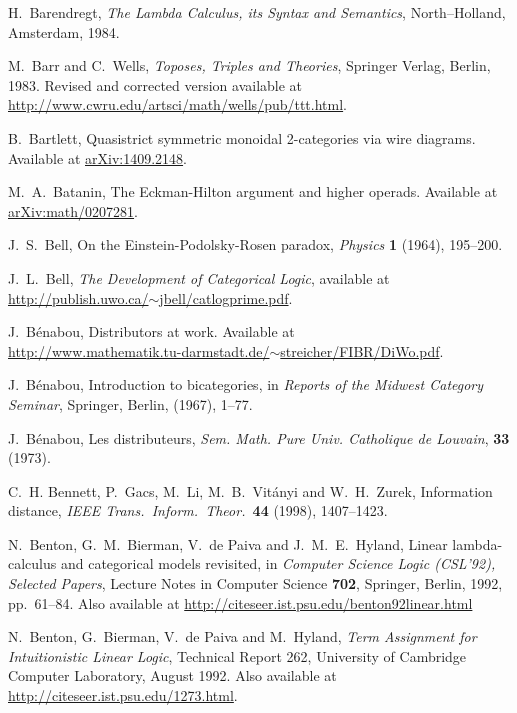\documentclass[12pt,twoside,openright]{report}
\begin{document}
\begin{thebibliography}{99}
 H.\ Barendregt, {\sl The Lambda Calculus, its Syntax and Semantics}, North--Holland, Amsterdam, 1984.

 M.\ Barr and C.\ Wells, {\sl Toposes, Triples and Theories}, Springer Verlag, Berlin, 1983.  Revised and corrected version available at \href{http://www.cwru.edu/artsci/math/wells/pub/ttt.html}{
http://www.cwru.edu/artsci/math/wells/pub/ttt.html}.

 B.\ Bartlett, Quasistrict symmetric monoidal 2-categories via wire diagrams.  Available at \href{http://arxiv.org/abs/1409.2148}{arXiv:1409.2148}.

M.\ A.\ Batanin, The Eckman-Hilton argument and higher operads.  Available at
\href{http://arxiv.org/abs/math/0207281}{arXiv:math/0207281}.

 J.\ S.\ Bell, On the Einstein-Podolsky-Rosen paradox, {\sl Physics} {\bf 1} (1964), 195--200.

 J.\ L.\ Bell, {\sl The Development of Categorical Logic}, available at \hfill \break
\href{http://publish.uwo.ca/~jbell/catlogprime.pdf}{http://publish.uwo.ca/$\sim$jbell/catlogprime.pdf}.

 J.\ B{\'e}nabou, Distributors at work. Available at \\
\href{http://www.mathematik.tu-darmstadt.de/~streicher/FIBR/DiWo.pdf}{http://www.mathematik.tu-darmstadt.de/$\sim$streicher/FIBR/DiWo.pdf}.

 J.\ B{\'e}nabou, Introduction to bicategories, in \textsl{Reports of the Midwest Category Seminar}, Springer, Berlin, (1967), 1--77.

 J.\ B{\'e}nabou, Les distributeurs, \textsl{Sem. Math. Pure Univ. Catholique de Louvain}, \textbf{33} (1973).

 C.\ H. Bennett, P.\ Gacs, M.\ Li, M.\ B.\ Vit\'anyi and W.\ H.\ Zurek, Information distance, \textit{IEEE Trans.\ 
Inform.\ Theor.\ }\textbf{44} (1998), 1407--1423.

 N.\ Benton, G.\ M.\ Bierman, V.\ de Paiva and J.\ M.\ E.\
Hyland, Linear lambda-calculus and categorical models revisited, in
{\sl Computer Science Logic (CSL'92), Selected Papers}, Lecture Notes in Computer Science {\bf 702}, Springer, Berlin, 1992, pp.\ 61--84. Also available at
\href{http://citeseer.ist.psu.edu/benton92linear.html}
{http://citeseer.ist.psu.edu/benton92linear.html}

 N.\ Benton, G.\ Bierman, V.\ de Paiva and M.\ Hyland,
{\sl Term Assignment for Intuitionistic Linear Logic}, Technical Report 262, University of Cambridge Computer Laboratory, August 1992. Also available at \href{http://citeseer.ist.psu.edu/1273.html}
{http://citeseer.ist.psu.edu/1273.html}.


\end{thebibliography}
\end{document}
